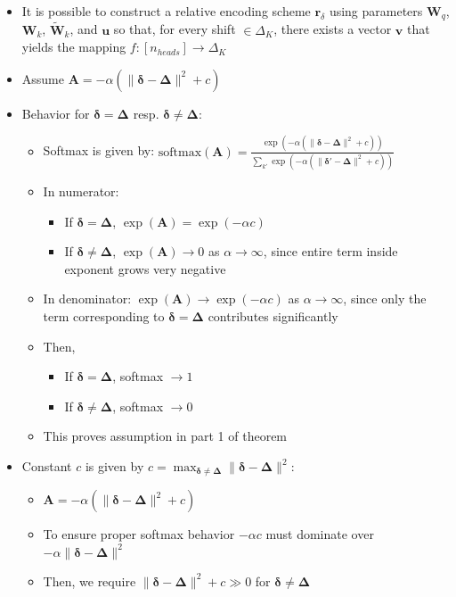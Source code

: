 \begin{itemize}
    \item It is possible to construct a relative encoding scheme $\boldsymbol{r}_\delta$ using parameters $\boldsymbol{W}_q$, $\boldsymbol{W}_k$, $\widetilde{\boldsymbol{W}}_k$, and $\boldsymbol{u}$ so that, for every shift $\in \Delta_K$, there exists a vector $\boldsymbol{v}$ that yields the mapping $f : [n_{heads}] \to \Delta_K$
    \item Assume $\boldsymbol{A} = -\alpha \left( \|\boldsymbol{\delta} - \boldsymbol{\Delta}\|^2 + c \right)$
    \item Behavior for $\boldsymbol{\delta} = \boldsymbol{\Delta}$ resp. $\boldsymbol{\delta} \neq \boldsymbol{\Delta}$:
    \begin{itemize}
        \item Softmax is given by:
        $\text{softmax}(\boldsymbol{A}) = \frac{\exp\left(-\alpha \left( \|\boldsymbol{\delta} - \boldsymbol{\Delta}\|^2 + c \right)\right)}{\sum_{k'} \exp\left(-\alpha \left( \|\boldsymbol{\delta}' - \boldsymbol{\Delta}\|^2 + c \right)\right)}$
        \item In numerator:
        \begin{itemize}
            \item If $\boldsymbol{\delta} = \boldsymbol{\Delta}$, $\exp(\boldsymbol{A}) = \exp(-\alpha c)$
            \item If $\boldsymbol{\delta} \neq \boldsymbol{\Delta}$, $\exp(\boldsymbol{A}) \to 0$ as $\alpha \to \infty$, since entire term inside exponent grows very negative
        \end{itemize}
        \item In denominator: $\exp(\boldsymbol{A}) \to \exp(-\alpha c)$ as $\alpha \to \infty$, since only the term corresponding to $\boldsymbol{\delta} = \boldsymbol{\Delta}$ contributes significantly
        \item Then,
        \begin{itemize}
            \item If $\boldsymbol{\delta} = \boldsymbol{\Delta}$, softmax $\to 1$
            \item If $\boldsymbol{\delta} \neq \boldsymbol{\Delta}$, softmax $\to 0$
        \end{itemize}
        \item This proves assumption in part 1 of theorem
    \end{itemize}
    \item Constant $c$ is given by $c = \max_{\boldsymbol{\delta} \neq \boldsymbol{\Delta}} \|\boldsymbol{\delta} - \boldsymbol{\Delta}\|^2$:
    \begin{itemize}
        \item $\boldsymbol{A} = -\alpha \left( \|\boldsymbol{\delta} - \boldsymbol{\Delta}\|^2 + c \right)$
        \item To ensure proper softmax behavior $-\alpha c$ must dominate over $-\alpha \|\boldsymbol{\delta} - \boldsymbol{\Delta}\|^2$
        \item Then, we require $\|\boldsymbol{\delta} - \boldsymbol{\Delta}\|^2 + c \gg 0$ for $\boldsymbol{\delta} \neq \boldsymbol{\Delta}$
    \end{itemize}
\end{itemize}